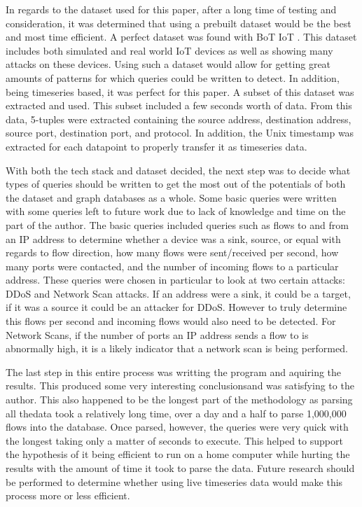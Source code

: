 \documentclass[conference]{IEEEtran}
\begin{document}
In regards to the dataset used for this paper, after a long time of testing and consideration, it was
determined that using a prebuilt dataset would be the best and most time efficient. A perfect dataset was
found with BoT IoT \cite{BoTIoT}. This dataset includes both simulated and real world IoT devices as well
as showing many attacks on these devices. Using such a dataset would allow for getting great amounts of
patterns for which queries could be written to detect. In addition, being timeseries based, it was perfect
for this paper. A subset of this dataset was extracted and used. This subset included a few seconds worth of
data. From this data, 5-tuples were extracted containing the source address, destination address, source port,
destination port, and protocol. In addition, the Unix timestamp was extracted for each datapoint to properly
transfer it as timeseries data.

With both the tech stack and dataset decided, the next step was to decide what types of queries should be
written to get the most out of the potentials of both the dataset and graph databases as a whole. Some basic
queries were written with some queries left to future work due to lack of knowledge and time on the part of 
the author. The basic queries included queries such as flows to and from an IP address to determine whether
a device was a sink, source, or equal with regards to flow direction, how many flows were sent/received per
second, how many ports were contacted, and the number of incoming flows to a particular address. These queries
were chosen in particular to look at two certain attacks: DDoS and Network Scan attacks. If an address were a 
sink, it could be a target, if it was a source it could be an attacker for DDoS. However to truly determine this
flows per second and incoming flows would also need to be detected. For Network Scans, if the number of ports
an IP address sends a flow to is abnormally high, it is a likely indicator that a network scan is being performed.

The last step in this entire process was writting the program and aquiring the results. This produced some very 
interesting conclusionsand was satisfying to the author. This also happened to be the longest part of the methodology
as parsing all thedata took a relatively long time, over a day and a half to parse 1,000,000 flows into the database. 
Once parsed, however, the queries were very quick with the longest taking only a matter of seconds to execute. This
helped to support the hypothesis of it being efficient to run on a home computer while hurting the results with the
amount of time it took to parse the data. Future research should be performed to determine whether using live
timeseries data would make this process more or less efficient.
\end{document}
